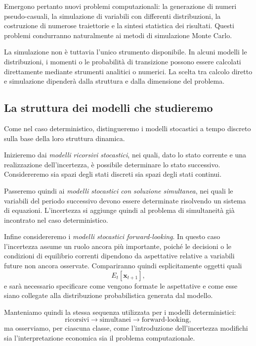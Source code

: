 \documentclass{book}
\begin{document}
Emergono pertanto nuovi problemi computazionali: la generazione di numeri pseudo-casuali, la simulazione di variabili con differenti distribuzioni, la costruzione di numerose traiettorie e la sintesi statistica dei risultati. Questi problemi condurranno naturalmente ai metodi di simulazione Monte Carlo.

La simulazione non è tuttavia l'unico strumento disponibile. In alcuni modelli le distribuzioni, i momenti o le probabilità di transizione possono essere calcolati direttamente mediante strumenti analitici o numerici. La scelta tra calcolo diretto e simulazione dipenderà dalla struttura e dalla dimensione del problema.

\subsection{La struttura dei modelli che studieremo}

Come nel caso deterministico, distingueremo i modelli stocastici a tempo discreto sulla base della loro struttura dinamica.

Inizieremo dai \emph{modelli ricorsivi stocastici}, nei quali, dato lo stato corrente e una realizzazione dell'incertezza, è possibile determinare lo stato successivo. Considereremo sia spazi degli stati discreti sia spazi degli stati continui.

Passeremo quindi ai \emph{modelli stocastici con soluzione simultanea}, nei quali le variabili del periodo successivo devono essere determinate risolvendo un sistema di equazioni. L'incertezza si aggiunge quindi al problema di simultaneità già incontrato nel caso deterministico.

Infine considereremo i \emph{modelli stocastici forward-looking}. In questo caso l'incertezza assume un ruolo ancora più importante, poiché le decisioni o le condizioni di equilibrio correnti dipendono da aspettative relative a variabili future non ancora osservate. Compariranno quindi esplicitamente oggetti quali
\[
E_t[\mathbf{x}_{t+1}],
\]
e sarà necessario specificare come vengono formate le aspettative e come esse siano collegate alla distribuzione probabilistica generata dal modello.

Manteniamo quindi la stessa sequenza utilizzata per i modelli deterministici:
\[
\text{ricorsivi}
\rightarrow
\text{simultanei}
\rightarrow
\text{forward-looking},
\]
ma osserviamo, per ciascuna classe, come l'introduzione dell'incertezza modifichi sia l'interpretazione economica sia il problema computazionale.
\end{document}
